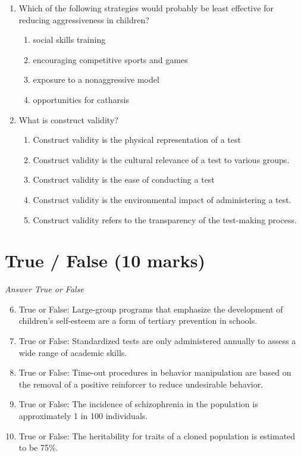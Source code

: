 \documentclass[12pt]{article}
\begin{document}
\begin{enumerate}[label=\arabic*.]
\begin{enumerate}[label=(\alph*)]
\end{enumerate}
\item Which of the following strategies would probably be least effective for reducing aggressiveness in children?
\begin{enumerate}[label=(\alph*)]
    \item social skills training
    \item encouraging competitive sports and games
    \item exposure to a nonaggressive model
    \item opportunities for catharsis
\end{enumerate}
\item What is construct validity?
\begin{enumerate}[label=(\alph*)]
    \item Construct validity is the physical representation of a test
    \item Construct validity is the cultural relevance of a test to various groups.
    \item Construct validity is the ease of conducting a test
    \item Construct validity is the environmental impact of administering a test.
    \item Construct validity refers to the transparency of the test-making process.
\end{enumerate}
\end{enumerate}

\section*{True / False (10 marks)}
\textit{Answer True or False}
\begin{enumerate}[label=\arabic*.]
\setcounter{enumi}{5}
\item True or False: Large-group programs that emphasize the development of children's self-esteem are a form of tertiary prevention in schools.
\item True or False: Standardized tests are only administered annually to assess a wide range of academic skills.
\item True or False: Time-out procedures in behavior manipulation are based on the removal of a positive reinforcer to reduce undesirable behavior.
\item True or False: The incidence of schizophrenia in the population is approximately 1 in 100 individuals.
\item True or False: The heritability for traits of a cloned population is estimated to be 75\%.
\end{enumerate}
\end{document}
